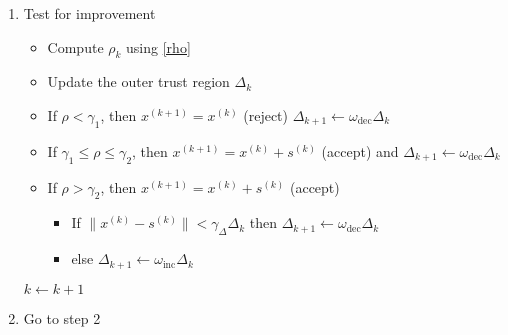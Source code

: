\begin{enumerate}
	\item Test for improvement
	\begin{itemize}
		\item Compute $\rho_k$ using \ref{rho}
    \item Update the outer trust region $\Delta_k$
		\item If $\rho < \gamma_1$, then $x^{(k+1)}=x^{(k)}$ (reject) $\Delta_{k+1} \leftarrow \omega_{\text{dec}} \Delta_k$
		\item If $\gamma_1 \le \rho \le \gamma_2$, then $x^{(k+1)}=x^{(k)}+s^{(k)}$ (accept) and $\Delta_{k+1} \leftarrow \omega_{\text{dec}} \Delta_k$
		\item If $\rho > \gamma_2$, then $x^{(k+1)}=x^{(k)}+s^{(k)}$ (accept)
		\begin{itemize}
            \item If $\|x^{(k)} - s^{(k)} \| < \gamma_{\Delta} \Delta_k$ then $\Delta_{k+1} \leftarrow \omega_{\text{dec}} \Delta_k$
            \item else $\Delta_{k+1} \leftarrow \omega_{\text{inc}} \Delta_k$
		\end{itemize}
	\end{itemize}
    $k \leftarrow k + 1$
	\item Go to step 2
\end{enumerate}
\noindent\makebox[\linewidth]{\rule{\paperwidth}{0.4pt}}







